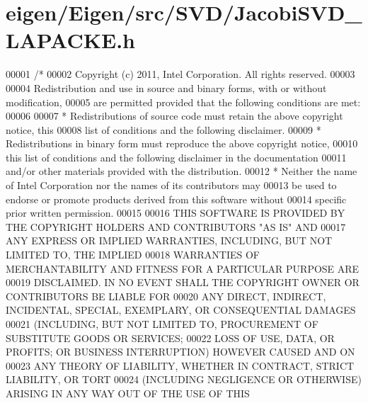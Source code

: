 \hypertarget{eigen_2_eigen_2src_2_s_v_d_2_jacobi_s_v_d___l_a_p_a_c_k_e_8h_source}{}\section{eigen/\+Eigen/src/\+S\+V\+D/\+Jacobi\+S\+V\+D\+\_\+\+L\+A\+P\+A\+C\+KE.h}
\label{eigen_2_eigen_2src_2_s_v_d_2_jacobi_s_v_d___l_a_p_a_c_k_e_8h_source}

\begin{DoxyCode}
00001 \textcolor{comment}{/*}
00002 \textcolor{comment}{ Copyright (c) 2011, Intel Corporation. All rights reserved.}
00003 \textcolor{comment}{}
00004 \textcolor{comment}{ Redistribution and use in source and binary forms, with or without modification,}
00005 \textcolor{comment}{ are permitted provided that the following conditions are met:}
00006 \textcolor{comment}{}
00007 \textcolor{comment}{ * Redistributions of source code must retain the above copyright notice, this}
00008 \textcolor{comment}{   list of conditions and the following disclaimer.}
00009 \textcolor{comment}{ * Redistributions in binary form must reproduce the above copyright notice,}
00010 \textcolor{comment}{   this list of conditions and the following disclaimer in the documentation}
00011 \textcolor{comment}{   and/or other materials provided with the distribution.}
00012 \textcolor{comment}{ * Neither the name of Intel Corporation nor the names of its contributors may}
00013 \textcolor{comment}{   be used to endorse or promote products derived from this software without}
00014 \textcolor{comment}{   specific prior written permission.}
00015 \textcolor{comment}{}
00016 \textcolor{comment}{ THIS SOFTWARE IS PROVIDED BY THE COPYRIGHT HOLDERS AND CONTRIBUTORS "AS IS" AND}
00017 \textcolor{comment}{ ANY EXPRESS OR IMPLIED WARRANTIES, INCLUDING, BUT NOT LIMITED TO, THE IMPLIED}
00018 \textcolor{comment}{ WARRANTIES OF MERCHANTABILITY AND FITNESS FOR A PARTICULAR PURPOSE ARE}
00019 \textcolor{comment}{ DISCLAIMED. IN NO EVENT SHALL THE COPYRIGHT OWNER OR CONTRIBUTORS BE LIABLE FOR}
00020 \textcolor{comment}{ ANY DIRECT, INDIRECT, INCIDENTAL, SPECIAL, EXEMPLARY, OR CONSEQUENTIAL DAMAGES}
00021 \textcolor{comment}{ (INCLUDING, BUT NOT LIMITED TO, PROCUREMENT OF SUBSTITUTE GOODS OR SERVICES;}
00022 \textcolor{comment}{ LOSS OF USE, DATA, OR PROFITS; OR BUSINESS INTERRUPTION) HOWEVER CAUSED AND ON}
00023 \textcolor{comment}{ ANY THEORY OF LIABILITY, WHETHER IN CONTRACT, STRICT LIABILITY, OR TORT}
00024 \textcolor{comment}{ (INCLUDING NEGLIGENCE OR OTHERWISE) ARISING IN ANY WAY OUT OF THE USE OF THIS}

\end{DoxyCode}
